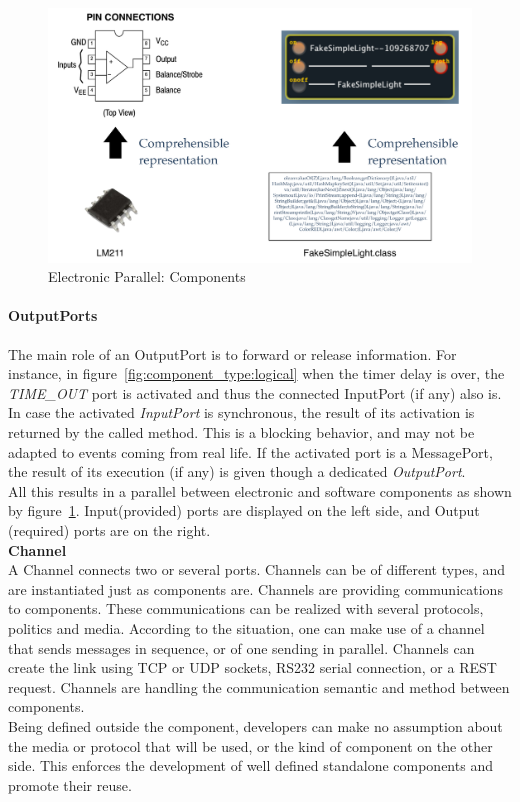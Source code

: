 \begin{figure}
\centering
	\includegraphics[width=.8\textwidth]{part2/pics/ComponentView.pdf}
	\caption{Electronic Parallel: Components}
  	\label{fig:elecComponent}
\end{figure}


\paragraph{OutputPorts}
The main role of an OutputPort is to forward or release information. For instance, in figure~\ref{fig:component_type:logical} when the timer delay is over, the \textit{TIME\_OUT} port is activated and thus the connected InputPort (if any) also is. In case the activated \textit{InputPort} is synchronous, the result of its activation is returned by the called method. This is a blocking behavior, and may not be adapted to events coming from real life. If the activated port is a MessagePort, the result of its execution (if any) is given though a dedicated \textit{OutputPort}.\\


All this results in a parallel between electronic and software components as shown by figure~\ref{fig:elecComponent}. Input(provided) ports are displayed on the left side, and Output (required) ports are on the right.\\

{\bf Channel}\\

A Channel connects two or several ports. Channels can be of different types, and are instantiated just as components are. Channels are providing communications to components. These communications can be realized with several protocols, politics and media. According to the situation, one can make use of a channel that sends messages in sequence, or of one sending in parallel. Channels can create the link using TCP or UDP sockets, RS232 serial connection, or a REST request. Channels are handling the communication semantic and method between components.\\
Being defined outside the component, developers can make no assumption about the media or protocol that will be used, or the kind of component on the other side. This enforces the development of well defined standalone components and promote their reuse.\\

